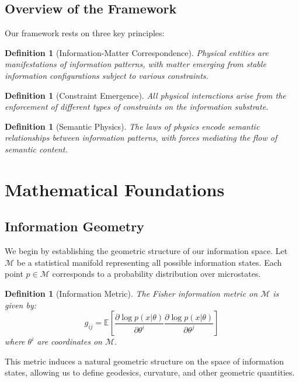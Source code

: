 \documentclass[11pt,a4paper]{article}
\newtheorem{definition}[theorem]{Definition}
\begin{document}
\subsection{Overview of the Framework}

Our framework rests on three key principles:

\begin{definition}[Information-Matter Correspondence]
Physical entities are manifestations of information patterns, with matter emerging from stable information configurations subject to various constraints.
\end{definition}

\begin{definition}[Constraint Emergence]
All physical interactions arise from the enforcement of different types of constraints on the information substrate.
\end{definition}

\begin{definition}[Semantic Physics]
The laws of physics encode semantic relationships between information patterns, with forces mediating the flow of semantic content.
\end{definition}

\section{Mathematical Foundations}

\subsection{Information Geometry}

We begin by establishing the geometric structure of our information space. Let $\mathcal{M}$ be a statistical manifold representing all possible information states. Each point $p \in \mathcal{M}$ corresponds to a probability distribution over microstates.

\begin{definition}[Information Metric]
The Fisher information metric on $\mathcal{M}$ is given by:
\begin{equation}
g_{ij} = \mathbb{E}\left[\frac{\partial \log p(x|\theta)}{\partial \theta^i} \frac{\partial \log p(x|\theta)}{\partial \theta^j}\right]
\end{equation}
where $\theta^i$ are coordinates on $\mathcal{M}$.
\end{definition}

This metric induces a natural geometric structure on the space of information states, allowing us to define geodesics, curvature, and other geometric quantities.
\end{document}
